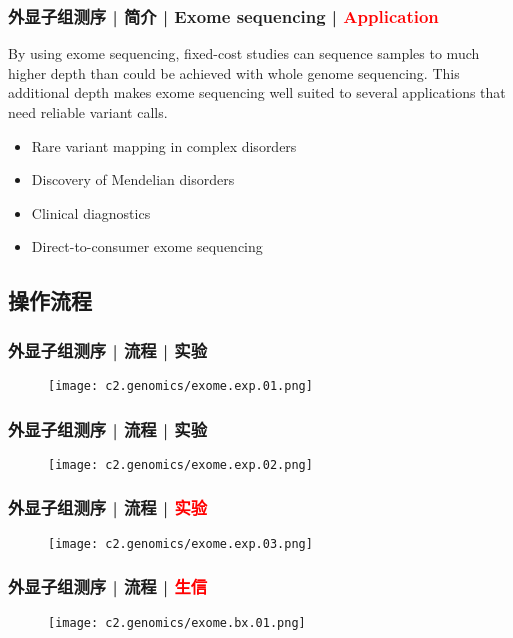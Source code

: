 \begin{frame}
  \frametitle{外显子组测序 | 简介 | Exome sequencing | \textcolor{red}{Application}}
  By using exome sequencing, fixed-cost studies can sequence samples to much higher depth than could be achieved with whole genome sequencing. This additional depth makes exome sequencing well suited to several applications that need reliable variant calls.
  \begin{itemize}
    \item Rare variant mapping in complex disorders
    \item Discovery of Mendelian disorders
    \item Clinical diagnostics
    \item Direct-to-consumer exome sequencing
  \end{itemize}
\end{frame}

\subsection{操作流程}
\begin{frame}
  \frametitle{外显子组测序 | 流程 | 实验}
  \begin{figure}
    \centering
    \texttt{[image: c2.genomics/exome.exp.01.png]}
  \end{figure}
\end{frame}

\begin{frame}
  \frametitle{外显子组测序 | 流程 | 实验}
  \begin{figure}
    \centering
    \texttt{[image: c2.genomics/exome.exp.02.png]}
  \end{figure}
\end{frame}

\begin{frame}
  \frametitle{外显子组测序 | 流程 | \textcolor{red}{实验}}
  \begin{figure}
    \centering
    \texttt{[image: c2.genomics/exome.exp.03.png]}
  \end{figure}
\end{frame}

\begin{frame}
  \frametitle{外显子组测序 | 流程 | \textcolor{red}{生信}}
  \begin{figure}
    \centering
    \texttt{[image: c2.genomics/exome.bx.01.png]}
  \end{figure}
\end{frame}

